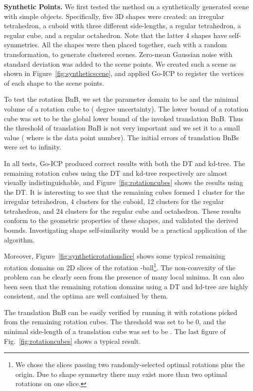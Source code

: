 \documentclass[10pt,journal,cspaper,compsoc]{IEEEtran}
\begin{document}
\vspace{0.06in}
\noindent\textbf{Synthetic Points.}
We first tested the method on a synthetically generated scene with simple objects. Specifically, five 3D shapes were created: an irregular tetrahedron, a cuboid with three different side-lengths, a regular tetrahedron, a regular cube, and a regular octahedron. Note that the latter 4 shapes have self-symmetries. All the shapes were then placed together, each with a random transformation, to generate clustered scenes. Zero-mean Gaussian noise with standard deviation  was added to the scene points. We created such a scene as shown in Figure~\ref{fig:syntheticscene}, and applied Go-ICP to register the vertices of each shape to the scene points.

To test the rotation BnB, we set the parameter domain to be  and the minimal volume of a rotation cube to  ( degree uncertainty). The lower bound of a rotation cube was set to be the global lower bound of the invoked translation BnB. Thus the threshold of translation BnB is not very important and we set it to a small value ( where  is the data point number). The initial errors  of translation BnBs were set to infinity.

In all tests, Go-ICP produced correct results with both the DT and kd-tree. The remaining rotation cubes using the DT and kd-tree respectively are almost visually indistinguishable, and Figure~\ref{fig:rotationcubes} shows the results using the DT. It is interesting to see that the remaining cubes formed 1 cluster for the irregular tetrahedron, 4 clusters for the cuboid, 12 clusters for the regular tetrahedron, and 24 clusters for the regular cube and octahedron. These results conform to the geometric properties of these shapes, and validated the derived bounds. Investigating shape self-similarity would be a practical application of the algorithm.

Moreover, Figure~\ref{fig:syntheticrotationslice} shows some typical remaining rotation domains on 2D slices of the rotation -ball\footnote{We chose the slices passing two randomly-selected optimal rotations plus the origin. Due to shape symmetry there may exist more than two optimal rotations on one slice.}. The non-convexity of the problem can be clearly seen from the presence of many local minima. It can also been seen that the remaining rotation domains using a DT and kd-tree are highly consistent, and the optima are well contained by them.

The translation BnB can be easily verified by running it with rotations picked from the remaining rotation cubes. The threshold was set to be 0, and the minimal side-length of a translation cube was set to be . The last figure of Fig.~\ref{fig:rotationcubes} shows a typical result.
\end{document}
